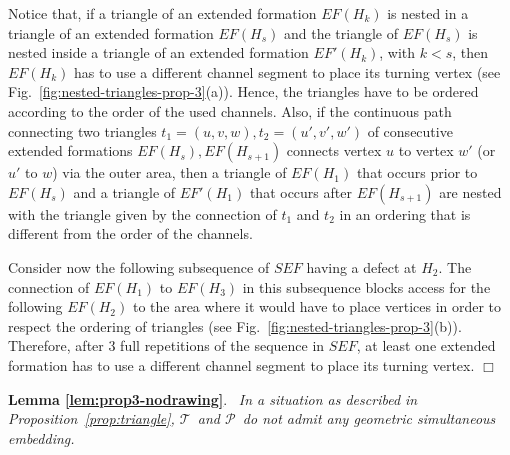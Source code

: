 \documentclass[a4paper,10pt]{llncs}
\newcounter{prop}
\renewenvironment{proof}
{{\bf Proof:}}{\hspace*{\fill}$\Box$\par\vspace{2mm}}
\newcommand{\rephrase}[3]{\noindent\textbf{#1 #2}.~\emph{#3}}
\newcommand{\T}{\mbox{$\mathcal T$ }}
\renewcommand{\P}{\mbox{$\mathcal P$ }}
\begin{document}
\begin{proof}
Notice that, if a triangle of an extended formation $EF(H_k)$ is nested in a triangle of an extended formation $EF(H_s)$ and the triangle of $EF(H_s)$ is nested inside a triangle of an extended formation $EF'(H_k)$, with $k<s$, then $EF(H_k)$ has to use a different channel segment to place its turning vertex (see Fig.~\ref{fig:nested-triangles-prop-3}(a)). Hence, the triangles have to be ordered according to the order of the used channels. Also, if the continuous path connecting two triangles $t_1=(u,v,w), t_2=(u',v',w')$ of consecutive extended formations $EF(H_s),EF(H_{s+1})$ connects vertex $u$ to vertex $w'$ (or $u'$ to $w$) via the outer area, then a triangle of $EF(H_1)$ that occurs prior to $EF(H_s)$ and a triangle of $EF'(H_1)$ that occurs after $EF(H_{s+1})$ are nested with the triangle given by the connection of $t_1$ and $t_2$ in an ordering that is different from the order of the channels.

Consider now the following subsequence of $SEF$ having a defect at $H_2$. The connection of $EF(H_1)$ to $EF(H_3)$ in this subsequence blocks access for the following $EF(H_2)$ to the area where it would have to place vertices in order to respect the ordering of triangles (see Fig.~\ref{fig:nested-triangles-prop-3}(b)).
Therefore, after 3 full repetitions of the sequence in $SEF$, at least one extended formation has to use a different channel segment to place its turning vertex.
\end{proof}

\rephrase{Lemma}{\ref{lem:prop3-nodrawing}}{
In a situation as described in Proposition~\ref{prop:triangle}, \T and \P do not admit any geometric simultaneous embedding.
}
\end{document}
